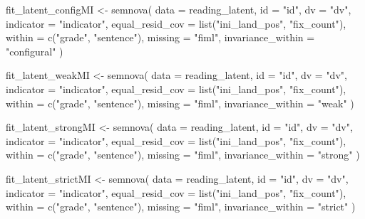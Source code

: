 \documentclass[
]{book}
\newenvironment{Shaded}{\begin{snugshade}}{\end{snugshade}}
\newcommand{\AttributeTok}[1]{\textcolor[rgb]{0.77,0.63,0.00}{#1}}
\newcommand{\FunctionTok}[1]{\textcolor[rgb]{0.00,0.00,0.00}{#1}}
\newcommand{\NormalTok}[1]{#1}
\newcommand{\OtherTok}[1]{\textcolor[rgb]{0.56,0.35,0.01}{#1}}
\newcommand{\StringTok}[1]{\textcolor[rgb]{0.31,0.60,0.02}{#1}}
\begin{document}
\begin{Shaded}
\begin{Highlighting}[]
\NormalTok{fit\_latent\_configMI }\OtherTok{\textless{}{-}} \FunctionTok{semnova}\NormalTok{(}
    \AttributeTok{data =}\NormalTok{ reading\_latent,}
    \AttributeTok{id =} \StringTok{"id"}\NormalTok{, }
    \AttributeTok{dv =} \StringTok{"dv"}\NormalTok{,}
    \AttributeTok{indicator =} \StringTok{"indicator"}\NormalTok{,}
    \AttributeTok{equal\_resid\_cov =} \FunctionTok{list}\NormalTok{(}\StringTok{"ini\_land\_pos"}\NormalTok{, }\StringTok{"fix\_count"}\NormalTok{),}
    \AttributeTok{within =} \FunctionTok{c}\NormalTok{(}\StringTok{"grade"}\NormalTok{, }\StringTok{"sentence"}\NormalTok{),}
    \AttributeTok{missing =} \StringTok{"fiml"}\NormalTok{,}
    \AttributeTok{invariance\_within =} \StringTok{"configural"}
\NormalTok{)}

\NormalTok{fit\_latent\_weakMI }\OtherTok{\textless{}{-}} \FunctionTok{semnova}\NormalTok{(}
    \AttributeTok{data =}\NormalTok{ reading\_latent,}
    \AttributeTok{id =} \StringTok{"id"}\NormalTok{, }
    \AttributeTok{dv =} \StringTok{"dv"}\NormalTok{,}
    \AttributeTok{indicator =} \StringTok{"indicator"}\NormalTok{,}
    \AttributeTok{equal\_resid\_cov =} \FunctionTok{list}\NormalTok{(}\StringTok{"ini\_land\_pos"}\NormalTok{, }\StringTok{"fix\_count"}\NormalTok{),}
    \AttributeTok{within =} \FunctionTok{c}\NormalTok{(}\StringTok{"grade"}\NormalTok{, }\StringTok{"sentence"}\NormalTok{),}
    \AttributeTok{missing =} \StringTok{"fiml"}\NormalTok{,}
    \AttributeTok{invariance\_within =} \StringTok{"weak"}
\NormalTok{)}

\NormalTok{fit\_latent\_strongMI }\OtherTok{\textless{}{-}} \FunctionTok{semnova}\NormalTok{(}
    \AttributeTok{data =}\NormalTok{ reading\_latent,}
    \AttributeTok{id =} \StringTok{"id"}\NormalTok{, }
    \AttributeTok{dv =} \StringTok{"dv"}\NormalTok{,}
    \AttributeTok{indicator =} \StringTok{"indicator"}\NormalTok{,}
    \AttributeTok{equal\_resid\_cov =} \FunctionTok{list}\NormalTok{(}\StringTok{"ini\_land\_pos"}\NormalTok{, }\StringTok{"fix\_count"}\NormalTok{),}
    \AttributeTok{within =} \FunctionTok{c}\NormalTok{(}\StringTok{"grade"}\NormalTok{, }\StringTok{"sentence"}\NormalTok{),}
    \AttributeTok{missing =} \StringTok{"fiml"}\NormalTok{,}
    \AttributeTok{invariance\_within =} \StringTok{"strong"}
\NormalTok{)}

\NormalTok{fit\_latent\_strictMI }\OtherTok{\textless{}{-}} \FunctionTok{semnova}\NormalTok{(}
    \AttributeTok{data =}\NormalTok{ reading\_latent,}
    \AttributeTok{id =} \StringTok{"id"}\NormalTok{, }
    \AttributeTok{dv =} \StringTok{"dv"}\NormalTok{,}
    \AttributeTok{indicator =} \StringTok{"indicator"}\NormalTok{,}
    \AttributeTok{equal\_resid\_cov =} \FunctionTok{list}\NormalTok{(}\StringTok{"ini\_land\_pos"}\NormalTok{, }\StringTok{"fix\_count"}\NormalTok{),}
    \AttributeTok{within =} \FunctionTok{c}\NormalTok{(}\StringTok{"grade"}\NormalTok{, }\StringTok{"sentence"}\NormalTok{),}
    \AttributeTok{missing =} \StringTok{"fiml"}\NormalTok{,}
    \AttributeTok{invariance\_within =} \StringTok{"strict"}
\NormalTok{)}


\end{Highlighting}
\end{Shaded}
\end{document}
